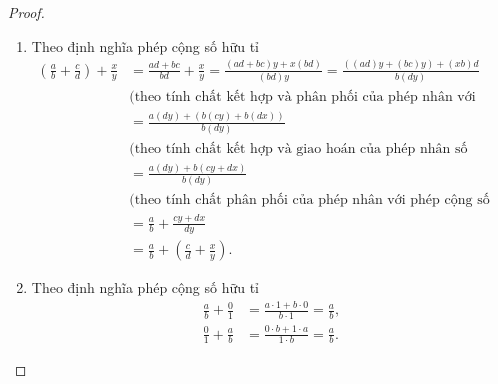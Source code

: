 \begin{proof}
    \begin{enumerate}[label={(\roman*)}]
        \item Theo định nghĩa phép cộng số hữu tỉ
              \begin{align*}
                  \left(\frac{a}{b} + \frac{c}{d}\right) + \frac{x}{y} & = \frac{a d + b c}{b d} + \frac{x}{y} = \frac{(a d + b c) y + x (b d)}{(b d) y} = \frac{((a d) y + (b c) y) +  (x b) d}{b (d y)} \\
                                                                       & \text{(theo tính chất kết hợp và phân phối của phép nhân với phép cộng số nguyên)}                                               \\
                                                                       & = \frac{a (d y) + (b (c y) + b(dx))}{b (d y)}                                                                                    \\
                                                                       & \text{(theo tính chất kết hợp và giao hoán của phép nhân số nguyên)}                                                             \\
                                                                       & = \frac{a (d y) + b (c y + dx)}{b (d y)}                                                                                         \\
                                                                       & \text{(theo tính chất phân phối của phép nhân với phép cộng số nguyên)}                                                          \\
                                                                       & = \frac{a}{b} + \frac{c y + dx}{d y}                                                                                             \\
                                                                       & = \frac{a}{b} + \left(\frac{c}{d} + \frac{x}{y}\right).
              \end{align*}
        \item Theo định nghĩa phép cộng số hữu tỉ
              \begin{align*}
                  \frac{a}{b} + \frac{0}{1} & = \frac{a\cdot 1 + b\cdot 0}{b\cdot 1} = \frac{a}{b}, \\
                  \frac{0}{1} + \frac{a}{b} & = \frac{0\cdot b + 1\cdot a}{1\cdot b} = \frac{a}{b}.

\end{align*}
\end{enumerate}
\end{proof}
